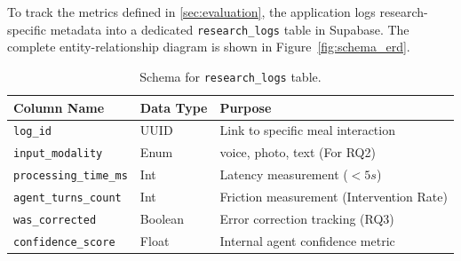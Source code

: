 To track the metrics defined in \ref{sec:evaluation}, the application logs research-specific metadata into a dedicated \texttt{research\_logs} table in Supabase. The complete entity-relationship diagram is shown in Figure~\ref{fig:schema_erd}.

\begin{table}[H]
    \centering
    \begin{tabular}{lll}
        \toprule
        \textbf{Column Name}          & \textbf{Data Type} & \textbf{Purpose}                         \\
        \midrule
        \texttt{log\_id}              & UUID               & Link to specific meal interaction        \\
        \texttt{input\_modality}      & Enum               & voice, photo, text (For RQ2)             \\
        \texttt{processing\_time\_ms} & Int                & Latency measurement ($< 5s$)             \\
        \texttt{agent\_turns\_count}  & Int                & Friction measurement (Intervention Rate) \\
        \texttt{was\_corrected}       & Boolean            & Error correction tracking (RQ3)          \\
        \texttt{confidence\_score}    & Float              & Internal agent confidence metric         \\
        \bottomrule
    \end{tabular}
    \caption{Schema for \texttt{research\_logs} table.}
    \label{tab:research_schema}
\end{table}

